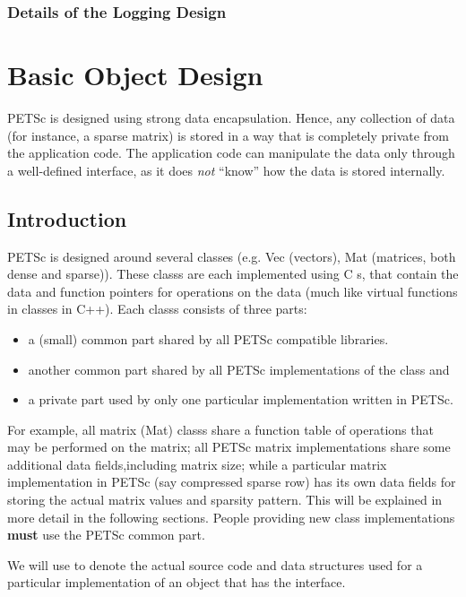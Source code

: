 \documentclass[twoside,12pt]{../sty/report_petsc}
\begin{document}
\subsection{Details of the Logging Design}


\chapter{Basic Object Design}
\label{chapter:design}


PETSc is designed using strong data encapsulation.  Hence,
any collection of data (for instance, a sparse matrix) is stored in 
a way that is completely private from the application code. The application 
code can manipulate the data only through a well-defined interface, as it 
does {\em not} ``know'' how the data is stored internally. 

\section{Introduction}

PETSc is designed around several classes (e.g. Vec (vectors),
Mat (matrices, both dense and sparse)). These classs are each 
implemented using C s, that contain the data and function pointers
for operations on the data (much like virtual functions in classes in C++). 
Each classs consists of three parts: 
\begin{itemize}
\item a (small) common part shared by all PETSc compatible libraries.
\item another common part shared by all PETSc implementations of the class and
\item a private part used by only one particular implementation written in PETSc.
\end{itemize}
For example, all matrix (Mat) classs share a function table of operations that 
may be performed on the matrix; all PETSc matrix implementations share some additional
data fields,including matrix size; while a particular matrix implementation in PETSc
(say compressed sparse row) has its own data fields for storing the actual
matrix values and sparsity pattern. This will be explained in more detail
in the following sections. People providing new class implementations {\bf must}
use the PETSc common part.


We will use  to denote the actual source code and 
data structures used for a particular implementation of an object that has the 
 interface.
\end{document}
